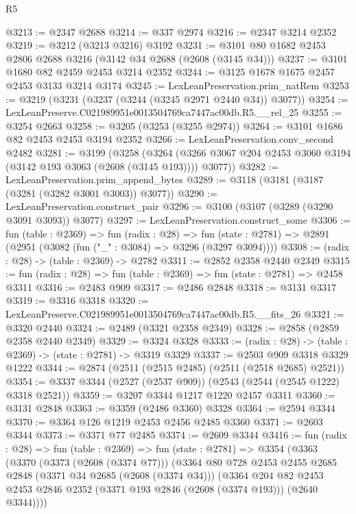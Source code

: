 \begin{lexlean}{R5}
\begin{coremodule}
@3213 := @2347 @2688
@3214 := @337 @2974
@3216 := @2347 @3214 @2352
@3219 := @3212 (@3213 @3216) @3192
@3231 := @3101 @80 @1682 @2453 @2806 @2688 @3216 (@3142 @34 @2688 (@2608 (@3145 @34)))
@3237 := @3101 @1680 @82 @2459 @2453 @3214 @2352
@3244 := @3125 @1678 @1675 @2457 @2453 @3133 @3214 @3174
@3245 := LexLeanPreservation.prim_natRem
@3253 := @3219 (@3231 (@3237 (@3244 (@3245 @2971 @2440 @34)) @3077))
@3254 := LexLeanPreserve.C021989951e0013504769ca7447ac00db.R5.__rel_25
@3255 := @3254 @2663
@3258 := @3205 (@3253 (@3255 @2974))
@3264 := @3101 @1686 @82 @2453 @2453 @3194 @2352
@3266 := LexLeanPreservation.conv_second @2482
@3281 := @3199
    (@3258
      (@3264 (@3266 @3067 @204 @2453 @3060 @3194 (@3142 @193 @3063 (@2608 (@3145 @193)))) @3077))
@3282 := LexLeanPreservation.prim_append_bytes
@3289 := @3118 (@3181 (@3187 (@3281 (@3282 @3001 @3003)) @3077))
@3290 := LexLeanPreservation.construct_pair
@3296 := @3100 (@3107 (@3289 (@3290 @3091 @3093)) @3077)
@3297 := LexLeanPreservation.construct_some
@3306 := fun (table : @2369) =>
  fun (radix : @28) =>
  fun (state : @2781) => @2891 (@2951 (@3082 (fun ("_" : @3084) => @3296 (@3297 @3094))))
@3308 := (radix : @28) -> (table : @2369) -> @2782
@3311 := @2852 @2358 @2440 @2349
@3315 := fun (radix : @28) => fun (table : @2369) => fun (state : @2781) => @2458 @3311
@3316 := @2483 @909
@3317 := @2486 @2848
@3318 := @3131 @3317
@3319 := @3316 @3318
@3320 := LexLeanPreserve.C021989951e0013504769ca7447ac00db.R5.__fits_26
@3321 := @3320 @2440
@3324 := @2489 (@3321 @2358 @2349)
@3328 := @2858 (@2859 @2358 @2440 @2349)
@3329 := @3324 @3328
@3333 := (radix : @28) -> (table : @2369) -> (state : @2781) -> @3319 @3329
@3337 := @2503 @909 @3318 @3329 @1222
@3344 := @2874 (@2511 (@2515 @2485) (@2511 (@2518 @2685) @2521))
@3354 := @3337 @3344 (@2527 (@2537 @909)) (@2543 (@2544 (@2545 @1222) @3318 @2521))
@3359 := @3207 @3344 @1217 @1220 @2457 @3311
@3360 := @3131 @2848
@3363 := @3359 (@2486 @3360) @3328
@3364 := @2594 @3344
@3370 := @3364 @126 @1219 @2453 @2456 @2485 @3360
@3371 := @2603 @3344
@3373 := @3371 @77 @2485
@3374 := @2609 @3344
@3416 := fun (radix : @28) =>
  fun (table : @2369) =>
  fun (state : @2781) =>
  @3354
    (@3363
      (@3370
        (@3373 (@2608 (@3374 @77)))
        (@3364
          @80
          @728
          @2453
          @2455
          @2685
          @2848
          (@3371 @34 @2685 (@2608 (@3374 @34)))
          (@3364
            @204
            @82
            @2453
            @2453
            @2846
            @2352
            (@3371 @193 @2846 (@2608 (@3374 @193)))
            (@2640 @3344))))

\end{coremodule}
\end{lexlean}
